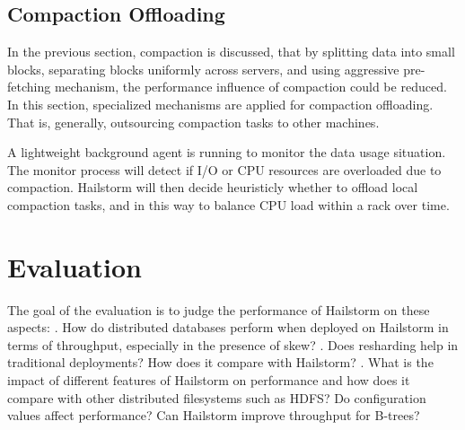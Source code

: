 \documentclass[a4paper,10pt,twoside]{article}
\begin{document}
\subsection{Compaction Offloading}
\par
In the previous section, compaction is discussed, that by splitting data into small blocks, separating blocks uniformly across servers, 
and using aggressive pre-fetching mechanism, the performance influence of compaction could be reduced.
In this section, specialized mechanisms are applied for compaction offloading.
That is, generally, outsourcing compaction tasks to other machines.
\par
A lightweight background agent is running to monitor the data usage situation. 
The monitor process will detect if I/O or CPU resources are overloaded due to compaction.
Hailstorm will then decide heuristicly whether to offload local compaction tasks, and in this way to balance CPU load within a rack over time.


\section{Evaluation}
\label{Evaluation}
The goal of the evaluation is to judge the performance of Hailstorm on these aspects\cite{mainpaper}:
. How do distributed databases perform when deployed on Hailstorm in terms of throughput, especially in the presence of skew? 
. Does resharding help in traditional deployments? How does it compare with Hailstorm?
. What is the impact of different features of Hailstorm on performance and how does it compare with other distributed filesystems such as HDFS? 
Do configuration values affect performance? Can Hailstorm improve throughput for B-trees?
\end{document}
